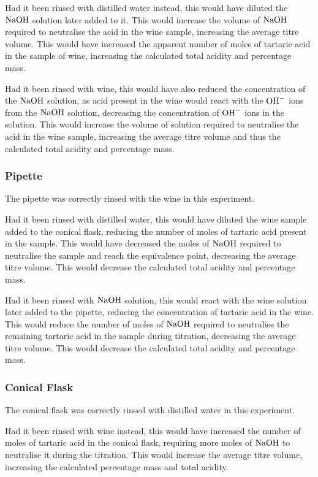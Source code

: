 \documentclass[a4paper,11pt]{article}
\begin{document}
Had it been rinsed with distilled water instead, this would have diluted the
$\ce{NaOH}$ solution later added to it. This would increase the volume of $\ce{NaOH}$ required to
neutralise the acid in the wine sample, increasing the average titre volume.
This would have increased the apparent number of moles of tartaric acid in the
sample of wine, increasing the calculated total acidity and percentage mass.

Had it been rinsed with wine, this would have
also reduced the concentration of the $\ce{NaOH}$ solution, as acid present
in the wine would react with the $\ce{OH-}$ ions from the $\ce{NaOH}$ solution,
decreasing the concentration of $\ce{OH-}$ ions in the solution. This would increase the
volume of solution required to neutralise the acid in the wine sample, increasing the
average titre volume and thus the calculated total acidity and percentage mass.


\subsubsection{Pipette}

The pipette was correctly rinsed with the wine in this experiment.

Had it been rinsed with distilled water, this would have diluted the wine sample
added to the conical flask, reducing the number of moles of tartaric acid
present in the sample. This would have decreased the moles of $\ce{NaOH}$
required to neutralise the sample and reach the equivalence point, decreasing
the average titre volume. This would decrease the calculated total acidity and
percentage mass.

Had it been rinsed with $\ce{NaOH}$ solution, this would react with the wine
solution later added to the pipette, reducing the concentration of tartaric
acid in the wine. This would reduce the number of moles of $\ce{NaOH}$ required
to neutralise the remaining tartaric acid in the sample during
titration, decreasing the average titre volume. This would decrease the
calculated total acidity and percentage mass.


\subsubsection{Conical Flask}

The conical flask was correctly rinsed with distilled water in this experiment.

Had it been rinsed with wine instead, this would have increased the number of
moles of tartaric acid in the conical flask, requiring more moles of
$\ce{NaOH}$ to neutralise it during the titration. This would increase the
average titre volume, increasing the calculated percentage mass and total
acidity.
\end{document}
